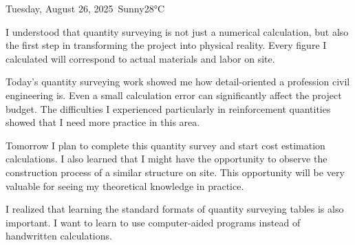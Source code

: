 \begin{dailyentry}{Tuesday, August 26, 2025}{\weathersunny\ Sunny}{28°C}
\begin{center}
\end{center}

I understood that quantity surveying is not just a numerical calculation, but also the first step in transforming the project into physical reality. Every figure I calculated will correspond to actual materials and labor on site.

\begin{dailynotes}
Today's quantity surveying work showed me how detail-oriented a profession civil engineering is. Even a small calculation error can significantly affect the project budget. The difficulties I experienced particularly in reinforcement quantities showed that I need more practice in this area.

Tomorrow I plan to complete this quantity survey and start cost estimation calculations. I also learned that I might have the opportunity to observe the construction process of a similar structure on site. This opportunity will be very valuable for seeing my theoretical knowledge in practice.

I realized that learning the standard formats of quantity surveying tables is also important. I want to learn to use computer-aided programs instead of handwritten calculations.
\end{dailynotes}

\begin{approvalsection}
\end{approvalsection}

\end{dailyentry}
